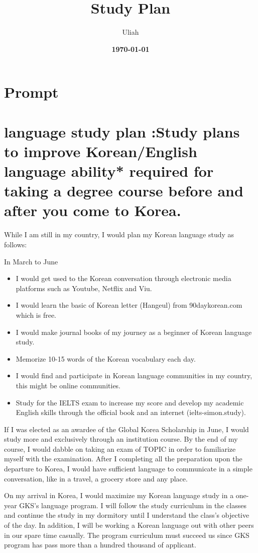 \documentclass[../main.tex]{subfiles}
\title{
	\textbf{ Study Plan} \\
} %
\date{\textbf{\today}}
\author{Uliah}
\begin{document}
\maketitle
\section{Prompt}

\section{language study plan :Study plans to improve Korean/English language ability* required for taking a degree course before and after you come to Korea.}

While I am still in my country, I would plan my Korean language study as follows:

In March to June
\begin{itemize}
	\item I would get used to the Korean conversation through electronic media platforms such as Youtube, Netflix and Viu.
	\item I would learn the basic of Korean letter (Hangeul) from 90daykorean.com which is free.
	\item I would make journal books of my journey as a beginner of Korean language study.
	\item Memorize 10-15 words of the Korean vocabulary each day.
	\item I would find and participate in Korean language communities in my country, this might be online communities.
	\item Study for the IELTS exam to increase my score and develop my academic English skills through the official book and an internet (ielts-simon.study).
\end{itemize}

If I was elected as an awardee of the Global Korea Scholarship in June, I would study more and exclusively through an institution course. By the end of my course, I would dabble on taking an exam of TOPIC in order to familiarize myself with the examination. After I completing all the preparation upon the departure to Korea, I would have sufficient language to communicate in a simple conversation, like in a travel, a grocery store and any place.

On my arrival in Korea, I would maximize my Korean language study in a one-year GKS's language program.
I will follow the study curriculum in the classes and continue the study in my dormitory until I understand the class's objective of the day.
In addition, I will be working a Korean language out with other peers in our spare time casually.
The program curriculum must succeed us since GKS program has pass more than a hundred thousand of applicant.
\end{document}
